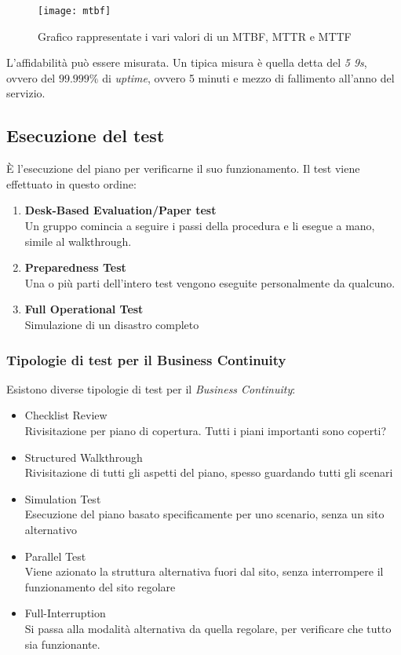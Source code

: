 \begin{figure}[H]
 \centering
 \texttt{[image: mtbf]}
 \caption{Grafico rappresentate i vari valori di un MTBF, MTTR e MTTF}
\end{figure}


L'affidabilità può essere misurata. Un tipica misura è quella detta del
\textit{5 9s}, ovvero del $99.999\%$ di \textit{uptime}, ovvero 5 minuti e
mezzo di fallimento all'anno del servizio.

\subsection{Esecuzione del test}

È l'esecuzione del piano per verificarne il suo funzionamento.
Il test viene effettuato in questo ordine:
\begin{enumerate}
  \item \textbf{Desk-Based Evaluation/Paper test} \\
  Un gruppo comincia a seguire i passi della procedura e li esegue a mano,
simile al walkthrough.
  \item \textbf{Preparedness Test} \\
  Una o più parti dell'intero test vengono eseguite personalmente da qualcuno.
  \item \textbf{Full Operational Test} \\
  Simulazione di un disastro completo
\end{enumerate}

\subsubsection{Tipologie di test per il Business Continuity}

Esistono diverse tipologie di test per il \textit{Business Continuity}:
\begin{itemize}
  \item Checklist Review \\
  Rivisitazione per piano di copertura. Tutti i piani importanti sono coperti?
  \item Structured Walkthrough \\
  Rivisitazione di tutti gli aspetti del piano, spesso guardando tutti gli
  scenari
  \item Simulation Test \\
  Esecuzione del piano basato specificamente per uno scenario, senza un sito
  alternativo
  \item Parallel Test \\
  Viene azionato la struttura alternativa fuori dal sito, senza
  interrompere il funzionamento del sito regolare
  \item Full-Interruption \\
  Si passa alla modalità alternativa da quella regolare, per verificare che
  tutto sia funzionante.
\end{itemize}

